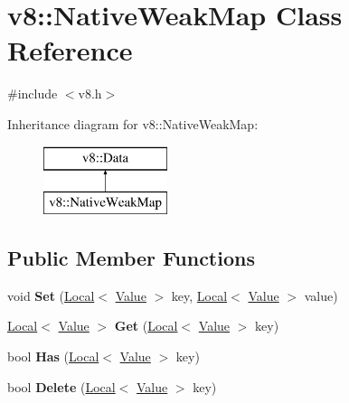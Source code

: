 \hypertarget{classv8_1_1_native_weak_map}{}\section{v8\+:\+:Native\+Weak\+Map Class Reference}
\label{classv8_1_1_native_weak_map}


{\ttfamily \#include $<$v8.\+h$>$}

Inheritance diagram for v8\+:\+:Native\+Weak\+Map\+:\begin{figure}[H]
\begin{center}
\leavevmode
\includegraphics[height=2.000000cm]{classv8_1_1_native_weak_map}
\end{center}
\end{figure}
\subsection*{Public Member Functions}
\begin{DoxyCompactItemize}
\item 
void {\bfseries Set} (\hyperlink{classv8_1_1_local}{Local}$<$ \hyperlink{classv8_1_1_value}{Value} $>$ key, \hyperlink{classv8_1_1_local}{Local}$<$ \hyperlink{classv8_1_1_value}{Value} $>$ value)\hypertarget{classv8_1_1_native_weak_map_ade0e4ce74820a0fcf8b51fb1cea733a7}{}\label{classv8_1_1_native_weak_map_ade0e4ce74820a0fcf8b51fb1cea733a7}

\item 
\hyperlink{classv8_1_1_local}{Local}$<$ \hyperlink{classv8_1_1_value}{Value} $>$ {\bfseries Get} (\hyperlink{classv8_1_1_local}{Local}$<$ \hyperlink{classv8_1_1_value}{Value} $>$ key)\hypertarget{classv8_1_1_native_weak_map_aea031a4a1d529817d78c59b14325fc71}{}\label{classv8_1_1_native_weak_map_aea031a4a1d529817d78c59b14325fc71}

\item 
bool {\bfseries Has} (\hyperlink{classv8_1_1_local}{Local}$<$ \hyperlink{classv8_1_1_value}{Value} $>$ key)\hypertarget{classv8_1_1_native_weak_map_a9de62c6399280088c86bb57c3988e7cb}{}\label{classv8_1_1_native_weak_map_a9de62c6399280088c86bb57c3988e7cb}

\item 
bool {\bfseries Delete} (\hyperlink{classv8_1_1_local}{Local}$<$ \hyperlink{classv8_1_1_value}{Value} $>$ key)\hypertarget{classv8_1_1_native_weak_map_ae3c04eaa9e745732f7b2f16c6e75dead}{}\label{classv8_1_1_native_weak_map_ae3c04eaa9e745732f7b2f16c6e75dead}

\end{DoxyCompactItemize}
